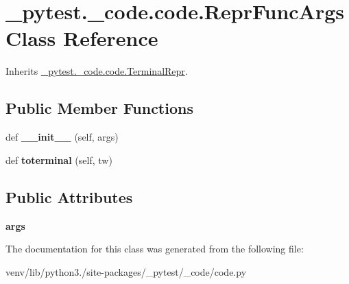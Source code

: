 \hypertarget{class__pytest_1_1__code_1_1code_1_1_repr_func_args}{}\section{\+\_\+pytest.\+\_\+code.\+code.\+Repr\+Func\+Args Class Reference}
\label{class__pytest_1_1__code_1_1code_1_1_repr_func_args}


Inherits \hyperlink{class__pytest_1_1__code_1_1code_1_1_terminal_repr}{\+\_\+pytest.\+\_\+code.\+code.\+Terminal\+Repr}.

\subsection*{Public Member Functions}
\begin{DoxyCompactItemize}
\item 
\mbox{\label{class__pytest_1_1__code_1_1code_1_1_repr_func_args_af8e3eb34d1ab91589b7ff14311433e6d}} 
def {\bfseries \+\_\+\+\_\+init\+\_\+\+\_\+} (self, args)
\item 
\mbox{\label{class__pytest_1_1__code_1_1code_1_1_repr_func_args_a62846787f9caedc841fda105191476b5}} 
def {\bfseries toterminal} (self, tw)
\end{DoxyCompactItemize}
\subsection*{Public Attributes}
\begin{DoxyCompactItemize}
\item 
\mbox{\label{class__pytest_1_1__code_1_1code_1_1_repr_func_args_aebab815bf1b8609fc54ad54e03edd863}} 
{\bfseries args}
\end{DoxyCompactItemize}


The documentation for this class was generated from the following file\+:\begin{DoxyCompactItemize}
\item 
venv/lib/python3./site-\/packages/\+\_\+pytest/\+\_\+code/code.\+py\end{DoxyCompactItemize}
